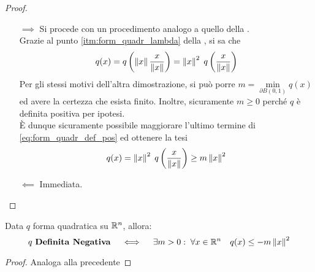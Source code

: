 \begin{appendices}
\begin{proposition}
	\begin{proof}~
		\begin{itemize}
			\item[$\implies$] Si procede con un procedimento analogo a quello della .\\
				Grazie al punto \ref{itm:form_quadr_lambda} della , si sa che
				\begin{equation}
					\label{eq:form_quadr_def_pos}
					q(x) = q \left( \left\|x\right\| \frac{x}{\left\|x\right\|} \right) = \left\|x\right\|^2 \; q \left( \frac{x}{\left\|x\right\|} \right)
				\end{equation}
				Per gli stessi motivi dell'altra dimostrazione, si può porre $m = \min\limits_{\partial B(0,1)} q(x)$ ed avere la certezza che esista finito. Inoltre, sicuramente $m \geq 0$ perché $q$ è definita positiva per ipotesi.\\
				È dunque sicuramente possibile maggiorare l'ultimo termine di \cref{eq:form_quadr_def_pos} ed ottenere la tesi
				\[q(x) = \left\|x\right\|^2 \; q \left( \frac{x}{\left\|x\right\|} \right) \geq m \left\|x\right\|^2\]
			\item[$\impliedby$] Immediata.
		\end{itemize}
	\end{proof}
\end{proposition}
\begin{corollary}
	\label{coro:form_quadr_def_neg_q_leq_-m}
	Data $q$ forma quadratica su $\mathbb{R}^n$, allora:
	\[
		q \text{ \textbf{Definita Negativa}} \quad \iff \quad \exists m > 0:\; \forall x \in \mathbb{R}^n \quad q(x) \leq -m \left\|x\right\|^2
	\]
	\begin{proof}
		Analoga alla precedente
	\end{proof}
\end{corollary}


\end{appendices}

